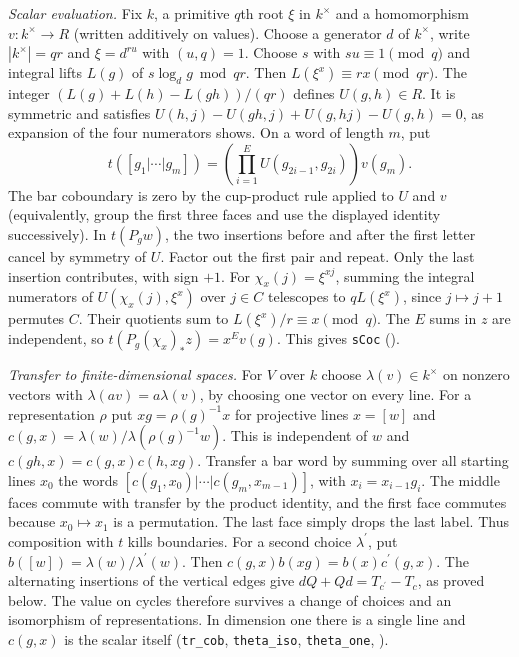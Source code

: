 \emph{Scalar evaluation.} Fix $k$, a primitive $q$th root $\xi$ in
$k^\times$ and a homomorphism $v:k^\times\to R$
(written additively on values). Choose a generator $d$ of $k^\times$,
write $|k^\times|=qr$ and $\xi=d^{ru}$ with $(u,q)=1$.
Choose $s$ with $su\equiv1\pmod q$ and integral lifts $L(g)$ of
$s\log_d g\bmod qr$. Then $L(\xi^x)\equiv rx\pmod{qr}$.
The integer $(L(g)+L(h)-L(gh))/(qr)$ defines $U(g,h)\in R$.
It is symmetric and satisfies
$U(h,j)-U(gh,j)+U(g,hj)-U(g,h)=0$, as expansion of the four
numerators shows. On a word of length $m$, put
\[
 t([g_1|\cdots|g_m])=
 \left(\prod_{i=1}^E U(g_{2i-1},g_{2i})\right)v(g_m).
\]
The bar coboundary is zero by the cup-product rule applied to $U$
and $v$ (equivalently, group the first three faces and use the displayed
identity successively). In $t(P_g w)$, the two insertions before and
after the first letter cancel by symmetry of $U$. Factor out the first
pair and repeat. Only the last insertion contributes, with sign $+1$.
For $\chi_x(j)=\xi^{xj}$, summing the integral numerators of
$U(\chi_x(j),\xi^x)$ over $j\in C$ telescopes to $qL(\xi^x)$,
since $j\mapsto j+1$ permutes $C$. Their quotients sum to
$L(\xi^x)/r\equiv x\pmod q$. The $E$ sums in $z$ are independent,
so $t(P_g(\chi_x)_*z)=x^E v(g)$.
This gives \nolinkurl{sCoc} ().

\emph{Transfer to finite-dimensional spaces.} For $V$ over $k$ choose
$\lambda(v)\in k^\times$ on nonzero vectors with
$\lambda(av)=a\lambda(v)$, by choosing one vector on every line.
For a representation $\rho$ put $xg=\rho(g)^{-1}x$ for projective
lines $x=[w]$ and
$c(g,x)=\lambda(w)/\lambda(\rho(g)^{-1}w)$.
This is independent of $w$ and
$c(gh,x)=c(g,x)c(h,xg)$. Transfer a bar word by summing over all
starting lines $x_0$ the words
$[c(g_1,x_0)|\cdots|c(g_m,x_{m-1})]$, with $x_i=x_{i-1}g_i$.
The middle faces commute with transfer by the product identity, and
the first face commutes because $x_0\mapsto x_1$ is a permutation.
The last face simply drops the last label. Thus composition with $t$
kills boundaries. For a second choice $\lambda^{\prime}$, put $b([w])=\lambda(w)/\lambda^{\prime}(w)$. Then $c(g,x)b(xg)=b(x)c^{\prime}(g,x)$. The alternating insertions of the vertical edges give $dQ+Qd=T_{c^{\prime}}-T_c$, as proved below.
The value on cycles therefore survives a change of choices and an
isomorphism of representations. In dimension one there is a single
line and $c(g,x)$ is the scalar itself
(\nolinkurl{tr_cob}, \nolinkurl{theta_iso}, \nolinkurl{theta_one},
).

